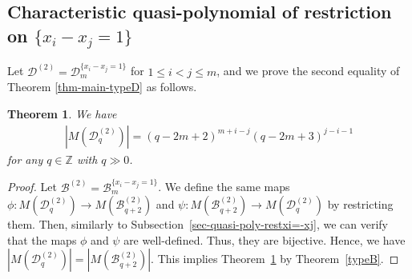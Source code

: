 \documentclass{article}
\theoremstyle{plain}
\newtheorem{Them}{Theorem}[section]
\theoremstyle{definition}
\theoremstyle{remark}
\numberwithin{equation}{section}
\newcommand{\Bc}{\mathcal{B}}
\newcommand{\Dc}{\mathcal{D}}
\newcommand{\ZZ}{\mathbb{Z}}
\begin{document}
\subsection{Characteristic quasi-polynomial of restriction on $\{x_i-x_j=1\}$}\label{sec-quasi-poly-restxi=xj+1}
Let $\Dc^{(2)}=\Dc_m^{\{x_i-x_j=1\}}$ for $1\leq i<j \leq m$, and we prove the second equality of Theorem \ref{thm-main-typeD} as follows.
\begin{Them}\label{chara-quasi-del-by-xi=xj+1}
We have
\begin{align*}
\left|M(\Dc^{(2)}_q)\right|=(q-2m+2)^{m+i-j}(q-2m+3)^{j-i-1}
\end{align*}
for any $q\in\ZZ$ with $q\gg 0$.
\end{Them}
\begin{proof}
Let $\Bc^{(2)} = \Bc_m^{\{x_i-x_j=1\}}$.
We define the same maps $\phi : M(\Dc^{(2)}_q) \to M(\Bc^{(2)}_{q+2})$ and $\psi  : M(\Bc^{(2)}_{q+2}) \to M(\Dc^{(2)}_q)$ by restricting them. %
%
Then, similarly to Subsection~\ref{sec-quasi-poly-restxi=-xj}, we can verify that the maps $\phi$ and $\psi$ are well-defined. Thus, they are bijective. Hence, we have $|M(\Dc_q^{(2)})| = |M(\Bc_{q+2}^{(2)})|$. This implies Theorem~\ref{chara-quasi-del-by-xi=xj+1} by Theorem~\ref{typeB}. 
\end{proof}
\end{document}
